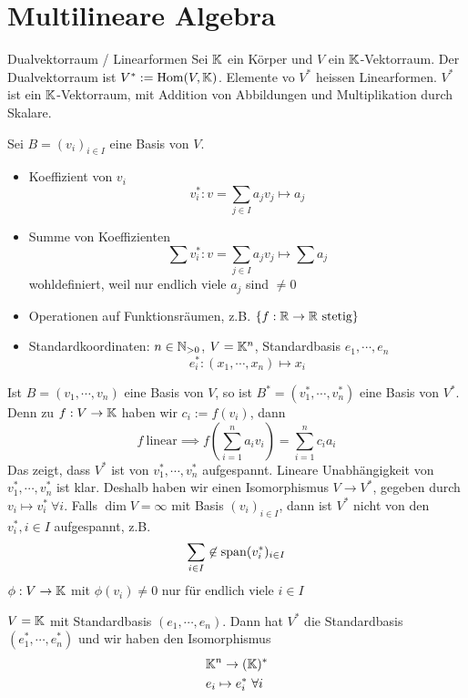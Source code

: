 \section{Multilineare Algebra}
\begin{Def}{Dualvektorraum / Linearformen}
  Sei $\mathbb{K}$ ein Körper und $V$ ein $\mathbb{K}$-Vektorraum. Der Dualvektorraum ist $V^*:=\operatorname{Hom}(V,\mathbb{K})$. Elemente vo $V^*$ heissen Linearformen. $V^*$ ist ein $\mathbb{K}$-Vektorraum, mit Addition von Abbildungen und Multiplikation durch Skalare.
\end{Def}
\begin{Eig}
  Sei $B=(v_i)_{i\in I}$ eine Basis von $V$.
  \begin{itemize}
    \item Koeffizient von $v_i$
      \[v_i^*:v=\sum_{j\in I}a_jv_j\mapsto a_j\]
    \item Summe von Koeffizienten
      \[\sum v_i^*:v=\sum_{j\in I}a_jv_j\mapsto \sum a_j\]
      wohldefiniert, weil nur endlich viele $a_j$ sind $\neq 0$
    \item Operationen auf Funktionsräumen, z.B. $\left\{ f:\mathbb{R}\to \mathbb{R}\ \text{stetig} \right\}$
    \item Standardkoordinaten: $n\in\mathbb{N}_{>0}$, $V=\mathbb{K}^n$, Standardbasis $e_1,\cdots,e_n$
      \[e_i^*:(x_1,\cdots,x_n)\mapsto x_i\]
  \end{itemize}
\end{Eig}
\begin{Bem}
  Ist $B=(v_1,\cdots,v_n)$ eine Basis von $V$, so ist $B^*=(v_1^*,\cdots,v_n^*)$ eine Basis von $V^*$. Denn zu $f:V\to \mathbb{K}$ haben wir $c_i:=f(v_i)$, dann \[f\ \text{linear} \implies f(\sum_{i=1}^na_iv_i)=\sum^n_{i=1}c_ia_i\]
  Das zeigt, dass $V^*$ ist von $v_1^*,\cdots,v_n^*$ aufgespannt. Lineare Unabhängigkeit von $v_1^*,\cdots,v_n^*$ ist klar. Deshalb haben wir einen Isomorphismus $V\to V^*$, gegeben durch $v_i\mapsto v_i^*\ \forall i$. Falls $\dim V=\infty$ mit Basis $(v_i)_{i\in I}$, dann ist $V^*$ nicht von den $v_i^*, i\in I$ aufgespannt, z.B.
  \[\sum_{i\in I}\not\in\operatorname{span}(v_i^*)_{i\in I}\]
  $\phi:V\to\mathbb{K}$ mit $\phi(v_i)\neq 0$ nur für endlich viele $i\in I$
\end{Bem}
\begin{Bsp}
  $V=\mathbb{K}$ mit Standardbasis $(e_1,\cdots,e_n)$. Dann hat $V^*$ die Standardbasis $(e_1^*,\cdots,e_n^*)$ und wir haben den Isomorphismus
  \begin{align*}
    &\mathbb{K}^n\to(\mathbb{K})^*\\
    &e_i\mapsto e^*_i\ \forall i
  \end{align*}
\end{Bsp}
